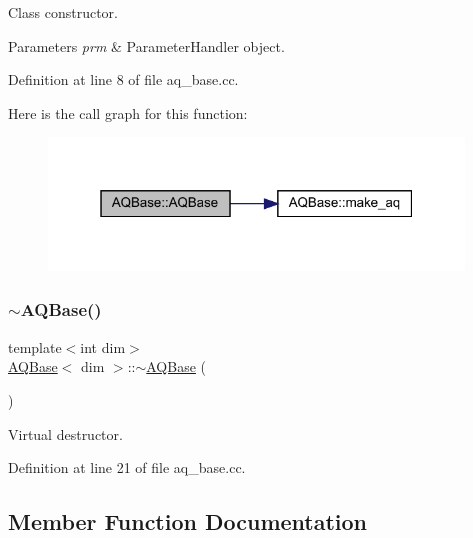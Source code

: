 Class constructor.


\begin{DoxyParams}{Parameters}
{\em prm} & Parameter\+Handler object. \\
\hline
\end{DoxyParams}


Definition at line 8 of file aq\+\_\+base.\+cc.

Here is the call graph for this function\+:\nopagebreak
\begin{figure}[H]
\begin{center}
\leavevmode
\includegraphics[width=313pt]{class_a_q_base_a3a05ceb6b201b4e6e605b260d766842d_cgraph}
\end{center}
\end{figure}
\mbox{\label{class_a_q_base_ab394068aae3c9b3f3932c3bfa3edceab}} 
\subsubsection{\texorpdfstring{$\sim$\+A\+Q\+Base()}{~AQBase()}}
{\footnotesize\ttfamily template$<$int dim$>$ \\
\hyperlink{class_a_q_base}{A\+Q\+Base}$<$ dim $>$\+::$\sim$\hyperlink{class_a_q_base}{A\+Q\+Base} (\begin{DoxyParamCaption}{ }\end{DoxyParamCaption})\hspace{0.3cm}{\ttfamily [virtual]}}



Virtual destructor. 



Definition at line 21 of file aq\+\_\+base.\+cc.



\subsection{Member Function Documentation}
\mbox{\label{class_a_q_base_ac2e0120510426f0b1dded2d5b546038b}} 
